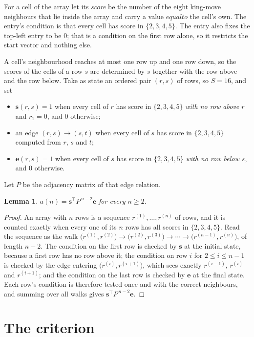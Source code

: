 \documentclass[11pt,a4paper]{article}
\theoremstyle{plain}
\newtheorem{lemma}[theorem]{Lemma}
\theoremstyle{definition}
\begin{document}
For a cell of the array let its \emph{score} be the number of the eight king-move neighbours that lie inside
the array and carry a value $equal to$ the cell's own. The entry's condition is that every cell
has score in $\{2,3,4,5\}$. The entry also fixes the top-left entry to be $0$; that is a condition on the first row alone, so it restricts the start vector and nothing else.

A cell's neighbourhood reaches at most one row up and one row down, so the scores of the
cells of a row $s$ are determined by $s$ together with the row above and the row below.
Take as state an ordered pair $(r,s)$ of rows, so $S=16$, and set
\begin{itemize}
\item $\mathbf{s}(r,s)=1$ when every cell of $r$ has score in $\{2,3,4,5\}$ \emph{with no row
above $r$} and $r_1=0$, and $0$ otherwise;
\item an edge $(r,s)\to(s,t)$ when every cell of $s$ has score in $\{2,3,4,5\}$ computed from
$r$, $s$ and $t$;
\item $\mathbf{e}(r,s)=1$ when every cell of $s$ has score in $\{2,3,4,5\}$ \emph{with no row
below $s$}, and $0$ otherwise.
\end{itemize}
Let $P$ be the adjacency matrix of that edge relation.

\begin{lemma}\label{lem:walk}
$a(n)=\mathbf{s}^{\!\top}P^{\,n-2}\mathbf{e}$ for every $n\ge2$.
\end{lemma}

\begin{proof}
An array with $n$ rows is a sequence $r^{(1)},\dots,r^{(n)}$ of rows, and it is counted
exactly when every one of its $n$ rows has all scores in $\{2,3,4,5\}$. Read the sequence as the
walk $\bigl(r^{(1)},r^{(2)}\bigr)\to\bigl(r^{(2)},r^{(3)}\bigr)\to\cdots\to
\bigl(r^{(n-1)},r^{(n)}\bigr)$, of length $n-2$. The condition on the first row is
checked by $\mathbf{s}$ at the initial state, because a first row has no row above it; the
condition on row $i$ for $2\le i\le n-1$ is checked by the edge entering
$\bigl(r^{(i)},r^{(i+1)}\bigr)$, which sees exactly $r^{(i-1)}$, $r^{(i)}$ and
$r^{(i+1)}$; and the condition on the last row is checked by $\mathbf{e}$ at the final
state. Each row's condition is therefore tested once and with the correct neighbours, and
summing over all walks gives $\mathbf{s}^{\!\top}P^{\,n-2}\mathbf{e}$.
\end{proof}

\section{The criterion}
\end{document}
